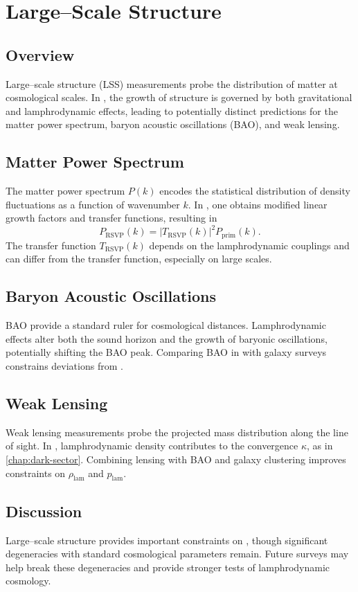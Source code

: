 
\chapter{Large--Scale Structure}
\label{chap:lss}

\section{Overview}

Large--scale structure (LSS) measurements probe the distribution of matter
at cosmological scales. In \rsvpabbr{}, the growth of structure is governed
by both gravitational and lamphrodynamic effects, leading to potentially
distinct predictions for the matter power spectrum, baryon acoustic
oscillations (BAO), and weak lensing.

\section{Matter Power Spectrum}

The matter power spectrum $P(k)$ encodes the statistical distribution of
density fluctuations as a function of wavenumber $k$. In \rsvpabbr{}, one
obtains modified linear growth factors and transfer functions, resulting in
\[
  P_{\mathrm{RSVP}}(k)
   = |T_{\mathrm{RSVP}}(k)|^2 P_{\mathrm{prim}}(k).
\]
The transfer function $T_{\mathrm{RSVP}}(k)$ depends on the lamphrodynamic
couplings and can differ from the \LCDM{} transfer function, especially on
large scales.

\section{Baryon Acoustic Oscillations}

BAO provide a standard ruler for cosmological distances. Lamphrodynamic
effects alter both the sound horizon and the growth of baryonic
oscillations, potentially shifting the BAO peak. Comparing BAO in \rsvpabbr{}
with galaxy surveys constrains deviations from \LCDM{}.

\section{Weak Lensing}

Weak lensing measurements probe the projected mass distribution along the
line of sight. In \rsvpabbr{}, lamphrodynamic density contributes to the
convergence $\kappa$, as in \cref{chap:dark-sector}. Combining lensing with
BAO and galaxy clustering improves constraints on $\rho_{\mathrm{lam}}$ and
$p_{\mathrm{lam}}$.

\section{Discussion}

Large--scale structure provides important constraints on \rsvpabbr{}, though
significant degeneracies with standard cosmological parameters remain.
Future surveys may help break these degeneracies and provide stronger tests
of lamphrodynamic cosmology.

\clearpage
